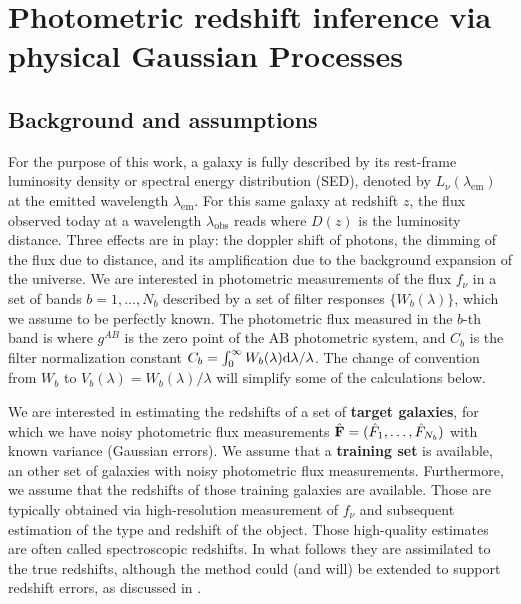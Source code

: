 \documentclass[aps,prd,showpacs,superscriptaddress,groupedaddress]{revtex4}  %
\begin{document}
\section{Photometric redshift inference via physical Gaussian Processes}\label{sec:methods}


\subsection{Background and assumptions}

For the purpose of this work, a galaxy is fully described by its rest-frame luminosity density or spectral energy distribution (SED), denoted by $L_\nu(\lambda_\mathrm{em})$ at the emitted wavelength $\lambda_\mathrm{em}$.
For this same galaxy at redshift $z$, the flux observed today at a wavelength $\lambda_\mathrm{obs}$ reads
where $D(z)$ is the luminosity distance. 
Three effects are in play: the doppler shift of photons, the dimming of the flux due to distance, and its amplification due to the background expansion of the universe. 
We are interested in photometric measurements of the flux $f_\nu$ in a  set of bands $b=1, \dots, N_b$ described by a set of filter responses $\{ W_b(\lambda) \}$, which we assume to be perfectly known.
The photometric flux measured in the $b$-th band is
where $g^{AB}$ is the zero point of the AB photometric system, and $C_b$ is the filter normalization constant $C_b = \int_0^\infty W_b(\lambda) \mathrm{d}\lambda / \lambda$. The change of convention from $W_b$ to  $V_b(\lambda) = W_b(\lambda)/\lambda$ will simplify some of the calculations below.

We are interested in estimating the redshifts of a set of {\bf target galaxies}, for which we have noisy photometric flux measurements $\hat{\mat{F}}=(\hat{F}_1, \dots, \hat{F}_{N_b})$ with known variance (\eg Gaussian errors). 
We assume that a {\bf training set} is available, \ie an other set of galaxies with noisy photometric flux measurements.
Furthermore, we assume that the redshifts of those training galaxies are available.
Those are typically obtained via high-resolution measurement of $f_\nu$ and subsequent estimation of the type and redshift of the object.
Those high-quality estimates are often called spectroscopic redshifts.
In what follows they are assimilated to the true redshifts, although the method could (and will) be extended to support redshift errors, as discussed in . 
\end{document}
